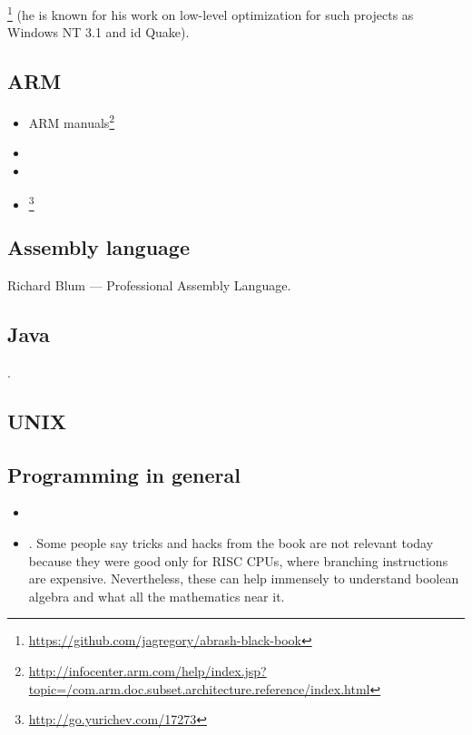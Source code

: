 \MAbrash\footnote{\AlsoAvailableAs \url{https://github.com/jagregory/abrash-black-book}}
(he is known for his work on low-level optimization for such projects as Windows NT 3.1 and id Quake).

\subsection{ARM}

\begin{itemize}
\item ARM manuals\footnote{\AlsoAvailableAs \url{http://infocenter.arm.com/help/index.jsp?topic=/com.arm.doc.subset.architecture.reference/index.html}}

\item \ARMSevenRef

\item \ARMSixFourRefURL

\item \ARMCookBook\footnote{\AlsoAvailableAs \url{http://go.yurichev.com/17273}}
\end{itemize}

\subsection{Assembly language}

Richard Blum --- Professional Assembly Language.

\subsection{Java}

\JavaBook.

\subsection{UNIX}

\TAOUP

\subsection{Programming in general}

\begin{itemize}

\item \RobPikePractice

\item \HenryWarren.
Some people say tricks and hacks from the book are not relevant today because they were good only for \ac{RISC} \ac{CPU}s,
where branching instructions are expensive.
Nevertheless, these can help immensely to understand boolean algebra and what all the mathematics near it.

\end{itemize}

